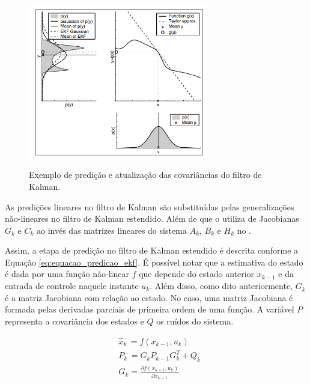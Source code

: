\documentclass[acronym, symbols, table, deposito]{fei}
\begin{document}
			\begin{figure}[!htb]
				\centering
				\caption{Exemplo de predição e atualização das covariâncias do filtro de Kalman.}
				\includegraphics[width=0.7\textwidth]{figura_linearizacao_ekf.png}
				\label{fig:ekf_linearizacao}
			\end{figure}
			
			As predições lineares no filtro de Kalman são substituídas pelas generalizações não-lineares no filtro de Kalman estendido. Além de que o  utiliza de Jacobianas $G_k$ e $C_k$ ao invés das matrizes lineares do sistema $A_k$, $B_k$ e $H_k$ no .
			
			Assim, a etapa de predição no filtro de Kalman estendido é descrita conforme a Equação \eqref{eq:equacao_predicao_ekf}. É possível notar que a estimativa do estado é dada por uma função não-linear $f$ que depende do estado anterior $x_{k-1}$ e da entrada de controle naquele instante $u_{k}$. Além disso, como dito anteriormente, $G_{k}$ é a matriz Jacobiana com relação ao estado. No caso, uma matriz Jacobiana é formada pelas derivadas parciais de primeira ordem de uma função. A variável $P$ representa a covariância dos estados e $Q$ os ruídos do sistema.
			
			\begin{equation} \label{eq:equacao_predicao_ekf}
				\begin{split}
					&\hat{x}_{k}^{-} = f(x_{k-1}, u_{k}) \\
					&P_{k}^{-} = G_{k}P_{k-1}G_{k}^{T} + Q_{k} \\
					&G_{k} = \frac{\partial f(x_{k-1}, u_{k})}{\partial x_{k-1}} 
				\end{split}
			\end{equation}
			
\end{document}
